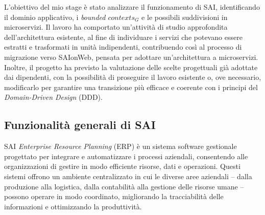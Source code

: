     \vspace{0.2 em}
    \noindent L'obiettivo del mio stage è stato analizzare il funzionamento di SAI, identificando il dominio applicativo, i \textit{bounded $contexts_G$} e le possibili suddivisioni in microservizi. Il lavoro ha comportato un'attività di studio approfondita dell'architettura esistente, al fine di individuare i servizi che potevano essere estratti e trasformati in unità indipendenti, contribuendo così al processo di migrazione verso SAIonWeb, pensata per adottare un'architettura a microservizi. Inoltre, il progetto ha previsto la valutazione delle scelte progettuali già adottate dai dipendenti, con la possibilità di proseguire il lavoro esistente o, ove necessario, modificarlo per garantire una transizione più efficace e coerente con i principi del \textit{Domain-Driven Design} (DDD). 
    
        \subsection{Funzionalità generali di SAI}
        SAI \textit{Enterprise Resource Planning} (ERP) è un sistema software gestionale progettato per integrare e automatizzare i processi aziendali, consentendo alle organizzazioni di gestire in modo efficiente risorse, dati e operazioni. Questi sistemi offrono un ambiente centralizzato in cui le diverse aree aziendali – dalla produzione alla logistica, dalla contabilità alla gestione delle risorse umane – possono operare in modo coordinato, migliorando la tracciabilità delle informazioni e ottimizzando la produttività.  

